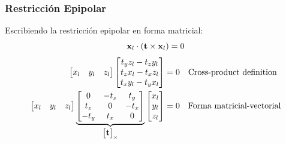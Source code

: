 \begin{frame}
    \frametitle{Restricción Epipolar}
    Escribiendo la restricción epipolar en forma matricial:
%
    \begin{equation*}
        \mathbf{x}_l \cdot (\boldsymbol{\mathbf{t}} \times \mathbf{x}_l) = 0
    \end{equation*}
%
    \begin{align*}
        \begin{bmatrix} x_l & y_l & z_l \end{bmatrix}
        \begin{bmatrix}
            t_y z_l - t_z y_l \\
            t_z x_l - t_x z_l \\
            t_x y_l - t_y x_l
        \end{bmatrix} &= 0 \quad \text{Cross-product definition}\\
        \begin{bmatrix} x_l & y_l & z_l \end{bmatrix}
        \underbrace{\begin{bmatrix}
            0 & -t_z & t_y \\
            t_z & 0 & -t_x \\
            -t_y & t_x & 0
        \end{bmatrix}}_{\begin{bmatrix}\boldsymbol{\mathbf{t}}\end{bmatrix}_{\times}}
        \begin{bmatrix} x_l \\ y_l \\ z_l \end{bmatrix} &= 0
        \quad \text{Forma matricial-vectorial}
    \end{align*}
%
\end{frame}

